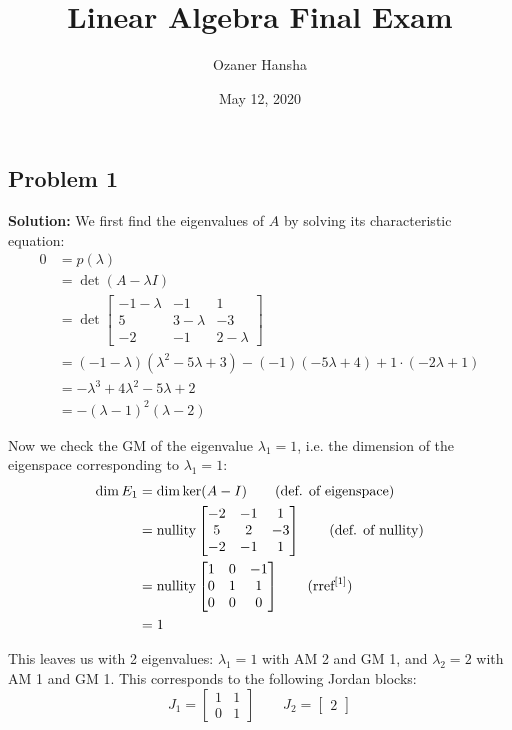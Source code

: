 \documentclass{article}
\begin{document}
\title{Linear Algebra Final Exam}
\author{Ozaner Hansha}
\date{May 12, 2020}
\maketitle

\subsection*{Problem 1}
\noindent\textbf{Solution:} We first find the eigenvalues of $A$ by solving its characteristic equation:
\begin{align*}
  0&=p(\lambda)\\
  &=\operatorname{det}(A-\lambda I)\\
  &=\operatorname{det}\begin{bmatrix}
    -1-\lambda&-1&1\\5&3-\lambda&-3\\-2&-1&2-\lambda
  \end{bmatrix}\\
  &=\left(-1-\lambda\right)\left(\lambda^2-5\lambda+3\right)-\left(-1\right)\left(-5\lambda+4\right)+1\cdot \left(-2\lambda+1\right)\\
  &=-\lambda^3+4\lambda^2-5\lambda+2\\
  &=-(\lambda-1)^2(\lambda-2)
\end{align*}



Now we check the GM of the eigenvalue $\lambda_1=1$, i.e. the dimension of the eigenspace corresponding to $\lambda_1=1$:
\begin{align*}
  \operatorname{dim}E_1&=\operatorname{dim}\operatorname{ker}(A-I)\tag{def. of eigenspace}\\
  &=\operatorname{nullity}\begin{bmatrix}
    -2&-1&1\\5&2&-3\\-2&-1&1
  \end{bmatrix}\tag{def. of nullity}\\
  &=\operatorname{nullity}\begin{bmatrix}
    1&0&-1\\ 0&1&1\\ 0&0&0
  \end{bmatrix}\tag{$\text{rref}^{[1]}$}\\
  &=1
\end{align*}

This leaves us with 2 eigenvalues: $\lambda_1=1$ with AM 2 and GM 1, and $\lambda_2=2$ with AM 1 and GM 1. This corresponds to the following Jordan blocks: 
$$J_1=\begin{bmatrix}
  1&1\\0&1
\end{bmatrix}\qquad J_2=\begin{bmatrix}
  2
\end{bmatrix}$$
\end{document}
